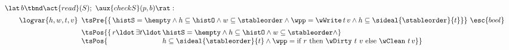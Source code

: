 
\[
\begin{array}{l}
\lat\, b \tbnd \act{read}(S);\ \aux{checkS}(p,b) \rat :\\[5pt]
\quad\quad \logvar{h,w,t,v}
\begin{array}[t]{l}
\tsPre{\{\, \histS = \hempty \wedge h \subseteq \histO \wedge
             w \subseteq \stableorder \wedge
             \wpp = \wWrite\, t\, v \wedge
         h \subseteq \sideal{\stableorder}{t} \}}\ \esc{bool} \\[5pt]
\tsPos{\{\, r\ldot\, \exists t\ldot\, \histS = \hempty \wedge
            h \subseteq \histO \wedge  w \subseteq \stableorder \wedge}\\
\tsPos{\phantom{\{\, r\ldot\, \exists t\ldot\,}
   h \subseteq \sideal{\stableorder}{t} \wedge 
    \wpp =  \textrm{if}\ r\
  \textrm{then}\ \wDirty\ t\, \,v\ \textrm{else}\ \wClean\ t\, v\}}
\end{array}
\end{array}
\]



